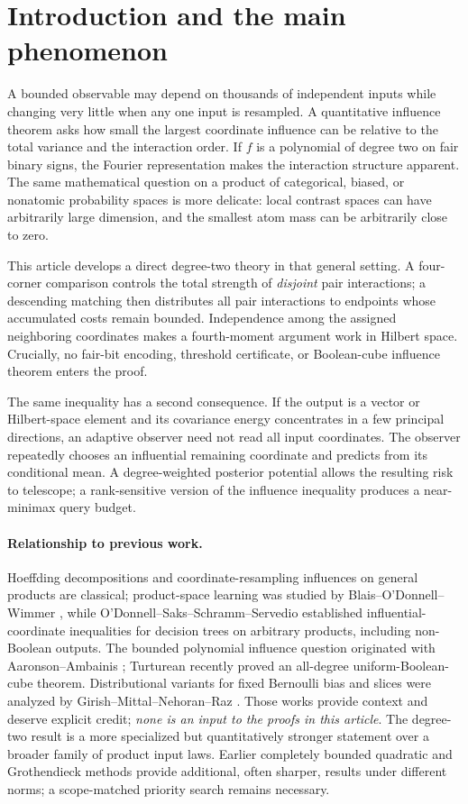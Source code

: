 \documentclass[11pt,letterpaper]{article}
\theoremstyle{definition}
\begin{document}
\section{Introduction and the main phenomenon}\label{sec:intro}
A bounded observable may depend on thousands of independent inputs while changing
very little when any one input is resampled. A quantitative influence theorem
asks how small the largest coordinate influence can be relative to the total
variance and the interaction order. If $f$ is a polynomial of degree two on
fair binary signs, the Fourier representation makes the interaction structure
apparent. The same mathematical question on a product of categorical, biased,
or nonatomic probability spaces is more delicate: local contrast spaces can
have arbitrarily large dimension, and the smallest atom mass can be arbitrarily
close to zero.

This article develops a direct degree-two theory in that general setting.
A four-corner comparison controls the total strength of \emph{disjoint} pair
interactions; a descending matching then distributes all pair interactions
to endpoints whose accumulated costs remain bounded. Independence among the
assigned neighboring coordinates makes a fourth-moment argument work in
Hilbert space. Crucially, no fair-bit encoding, threshold certificate, or
Boolean-cube influence theorem enters the proof.

The same inequality has a second consequence. If the output is a vector or
Hilbert-space element and its covariance energy concentrates in a few
principal directions, an adaptive observer need not read all input coordinates.
The observer repeatedly chooses an influential remaining coordinate and
predicts from its conditional mean. A degree-weighted posterior potential
allows the resulting risk to telescope; a rank-sensitive version of the
influence inequality produces a near-minimax query budget.

\paragraph{Relationship to previous work.}
Hoeffding decompositions and coordinate-resampling influences on general
products are classical; product-space learning was studied by
Blais--O'Donnell--Wimmer \cite{BOW2008}, while O'Donnell--Saks--Schramm--Servedio
\cite{OSSS2005} established influential-coordinate inequalities for decision
trees on arbitrary products, including non-Boolean outputs. The bounded
polynomial influence question originated with Aaronson--Ambainis
\cite{AA2014}; Turturean \cite{Turturean2026} recently proved an all-degree
uniform-Boolean-cube theorem. Distributional variants for fixed Bernoulli bias
and slices were analyzed by Girish--Mittal--Nehoran--Raz \cite{GMNR2026}.
Those works provide context and deserve explicit credit; \emph{none is an
input to the proofs in this article}. The degree-two result is a more
specialized but quantitatively stronger statement over a broader family of
product input laws. Earlier completely bounded quadratic and Grothendieck
methods provide additional, often sharper, results under different norms;
a scope-matched priority search remains necessary.
\end{document}
